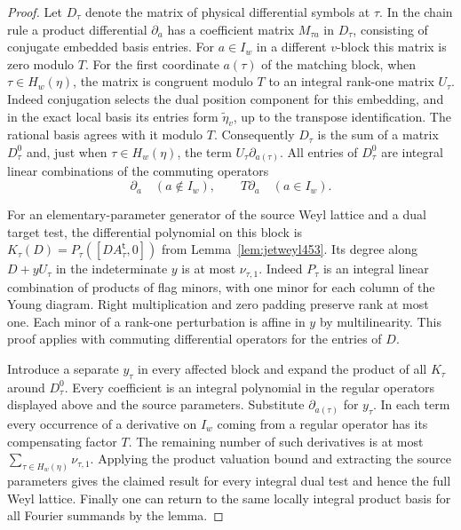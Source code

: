 \documentclass[a4paper,11pt]{article}
\theoremstyle{definition}
\theoremstyle{remark}
\numberwithin{equation}{section}
\begin{document}
\begin{proof}
Let \(D_\tau\) denote the matrix of physical differential
symbols at \(\tau\). In the chain rule a product differential
\(\partial_a\) has a coefficient matrix \(M_{\tau a}\) in
\(D_\tau\), consisting of conjugate embedded basis entries.
For \(a\in I_w\) in a different \(v\)-block this matrix is
zero modulo \(T\). For the first coordinate \(a(\tau)\) of
the matching block, when \(\tau\in H_w(\eta)\), the matrix
is congruent modulo \(T\) to an integral rank-one matrix
\(U_\tau\). Indeed conjugation selects the dual position
component for this embedding, and in the exact local basis
its entries form \(\widetilde\eta_v\), up to the transpose
identification. The rational basis agrees with it modulo \(T\).
Consequently \(D_\tau\) is the sum of a matrix \(D_\tau^0\)
and, just when \(\tau\in H_w(\eta)\), the term
\(U_\tau\partial_{a(\tau)}\). All entries of \(D_\tau^0\)
are integral linear combinations of the commuting operators
\[
                 \partial_a\quad(a\notin I_w),\qquad
                 T\partial_a\quad(a\in I_w).
\]

For an elementary-parameter generator of the source Weyl
lattice and a dual target test, the differential polynomial
on this block is \(K_\tau(D)=P_\tau([DA_\tau^{\mathsf t},0])\)
from Lemma~\ref{lem:jetweyl453}. Its degree along
\(D+yU_\tau\) in the indeterminate \(y\) is at most
\(\nu_{\tau,1}\). Indeed \(P_\tau\) is an integral linear
combination of products of flag minors, with one minor for
each column of the Young diagram. Right multiplication and
zero padding preserve rank at most one. Each minor of a
rank-one perturbation is affine in \(y\) by multilinearity.
This proof applies with commuting differential operators for
the entries of \(D\).

Introduce a separate \(y_\tau\) in every affected block
and expand the product of all \(K_\tau\) around \(D_\tau^0\).
Every coefficient is an integral polynomial in the regular
operators displayed above and the source parameters. Substitute
\(\partial_{a(\tau)}\) for \(y_\tau\). In each term every
occurrence of a derivative on \(I_w\) coming from a regular
operator has its compensating factor \(T\). The remaining
number of such derivatives is at most
\(\sum_{\tau\in H_w(\eta)}\nu_{\tau,1}\). Applying the product
valuation bound and extracting the source parameters gives
the claimed result for every integral dual test and hence the
full Weyl lattice. Finally one can return to the same locally
integral product basis for all Fourier summands by the lemma.
\end{proof}
\end{document}
